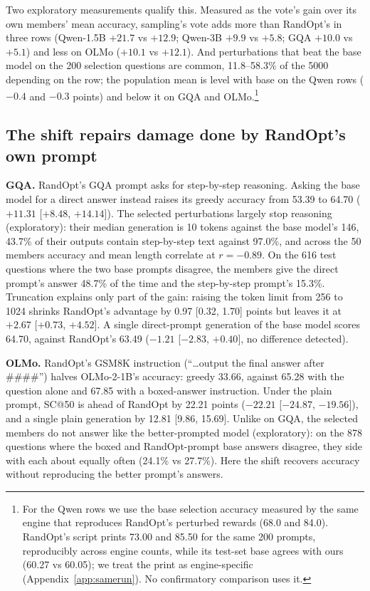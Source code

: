 \documentclass{article}
\makeatletter
\newcommand{\SC}{SC@50}
\makeatother
\begin{document}
Two exploratory measurements qualify this. Measured as the vote's gain over its own members' mean accuracy, sampling's
vote adds more than RandOpt's in three rows (Qwen-1.5B $+21.7$ vs $+12.9$; Qwen-3B $+9.9$ vs $+5.8$; GQA $+10.0$ vs
$+5.1$) and less on OLMo ($+10.1$ vs $+12.1$). And perturbations that beat the base model on the 200 selection questions
are common, 11.8--58.3\% of the 5000 depending on the row; the population mean is level with base on the Qwen rows
($-0.4$ and $-0.3$ points) and below it on GQA and OLMo.\footnote{For the Qwen rows we use the base selection accuracy
measured by the same engine that reproduces RandOpt's perturbed rewards (68.0 and 84.0). RandOpt's script prints 73.00
and 85.50 for the same 200 prompts, reproducibly across engine counts, while its test-set base agrees with ours (60.27
vs 60.05); we treat the print as engine-specific (Appendix~\ref{app:samerun}). No confirmatory comparison uses it.}

\subsection{The shift repairs damage done by RandOpt's own prompt}\label{sec:damage}
\textbf{GQA.} RandOpt's GQA prompt asks for step-by-step reasoning. Asking the base model for a direct answer instead
raises its greedy accuracy from 53.39 to 64.70 ($+11.31$ [$+8.48$, $+14.14$]). The selected perturbations largely stop
reasoning (exploratory): their median generation is 10 tokens against the base model's 146, 43.7\% of their outputs
contain step-by-step text against 97.0\%, and across the 50 members accuracy and mean length correlate at $r = -0.89$.
On the 616 test questions where the two base prompts disagree, the members give the direct prompt's answer 48.7\% of
the time and the step-by-step prompt's 15.3\%. Truncation explains only part of the gain: raising the token limit
from 256 to 1024 shrinks RandOpt's advantage by 0.97 [0.32, 1.70] points but leaves it at $+2.67$ [$+0.73$, $+4.52$].
A single direct-prompt generation of the base model scores 64.70, against RandOpt's 63.49 ($-1.21$ [$-2.83$,
$+0.40$], no difference detected).

\textbf{OLMo.} RandOpt's GSM8K instruction (``\ldots output the final answer after \#\#\#\#'') halves OLMo-2-1B's
accuracy: greedy 33.66, against 65.28 with the question alone and 67.85 with a boxed-answer instruction. Under the
plain prompt, \SC{} is ahead of RandOpt by 22.21 points ($-22.21$ [$-24.87$, $-19.56$]), and a single plain generation
by 12.81 [9.86, 15.69]. Unlike on GQA, the selected members do not answer like the better-prompted model
(exploratory): on the 878 questions where the boxed and RandOpt-prompt base answers disagree, they side with each about
equally often (24.1\% vs 27.7\%). Here the shift recovers accuracy without reproducing the better prompt's answers.
\end{document}
